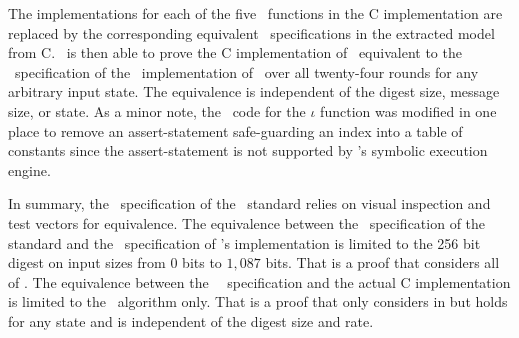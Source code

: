 The implementations for each of the five \keccak\ functions in the C implementation are replaced by the corresponding equivalent \cryptol\ specifications in the extracted model from C.
\saw\ is then able to prove the C implementation of \keccak\ equivalent to the \cryptol\ specification of the \openssl\ implementation of \keccak\ over all twenty-four rounds for any arbitrary input state.
The equivalence is independent of the digest size, message size, or state.
As a minor note, the \openssl\ code for the $\iota$ function was modified in one place to remove an assert-statement safe-guarding an index into a table of constants since the assert-statement is not supported by \saw's symbolic execution engine.


In summary, the \cryptol\ specification of the \fips\ standard relies on visual inspection and test vectors for equivalence.
The equivalence between the \cryptol\ specification of the standard and the \cryptol\ specification of \openssl's implementation is limited to the 256 bit digest on input sizes from $0$ bits to $1,087$ bits.
That is a proof that considers all of .
The equivalence between the \openssl\ \cryptol\ specification and the actual C implementation is limited to the \keccak\ algorithm only.
That is a proof that only considers  in  but holds for any state and is independent of the digest size and rate.

